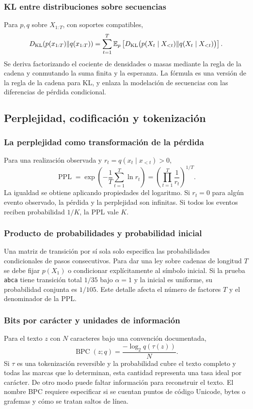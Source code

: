 \subsubsection{KL entre distribuciones sobre secuencias}
Para $p,q$ sobre $X_{1:T}$, con soportes compatibles,
\[
D_{\rm KL}(p(x_{1:T})\|q(x_{1:T}))=
\sum_{t=1}^T\mathbb E_p\left[
D_{\rm KL}\bigl(p(X_t\mid X_{<t})\|q(X_t\mid X_{<t})\bigr)\right].
\]
Se deriva factorizando el cociente de densidades o masas mediante la regla
de la cadena y conmutando la suma finita y la esperanza. La fórmula es una
versión de la regla de la cadena para KL, y enlaza la modelación de
secuencias con las diferencias de pérdida condicional.

\subsection{Perplejidad, codificación y tokenización}
\subsubsection{La perplejidad como transformación de la pérdida}
Para una realización observada y $r_t=q(x_t\mid x_{<t})>0$,
\[
\operatorname{PPL}=\exp\left(-\frac1T\sum_{t=1}^T\ln r_t\right)
=\left(\prod_{t=1}^T\frac1{r_t}\right)^{1/T}.
\]
La igualdad se obtiene aplicando propiedades del logaritmo. Si $r_t=0$
para algún evento observado, la pérdida y la perplejidad son infinitas.
Si todos los eventos reciben probabilidad $1/K$, la PPL vale $K$.
\subsubsection{Producto de probabilidades y probabilidad inicial}
Una matriz de transición por sí sola solo especifica las probabilidades
condicionales de pasos consecutivos. Para dar una ley sobre cadenas de
longitud $T$ se debe fijar $p(X_1)$ o condicionar explícitamente al símbolo
inicial. Si la prueba \texttt{abca} tiene transición total $1/35$ bajo
$\alpha=1$ y la inicial es uniforme, su probabilidad conjunta es $1/105$.
Este detalle afecta el número de factores $T$ y el denominador de la PPL.
\subsubsection{Bits por carácter y unidades de información}
Para el texto $z$ con $N$ caracteres bajo una convención documentada,
\[
\operatorname{BPC}(z;q)=\frac{-\log_2q(\tau(z))}{N}.
\]
Si $\tau$ es una tokenización reversible y la probabilidad cubre el texto
completo y todas las marcas que lo determinan, esta cantidad representa
una tasa ideal por carácter. De otro modo puede faltar información para
reconstruir el texto. El nombre BPC requiere especificar si se cuentan
puntos de código Unicode, bytes o grafemas y cómo se tratan saltos de línea.
